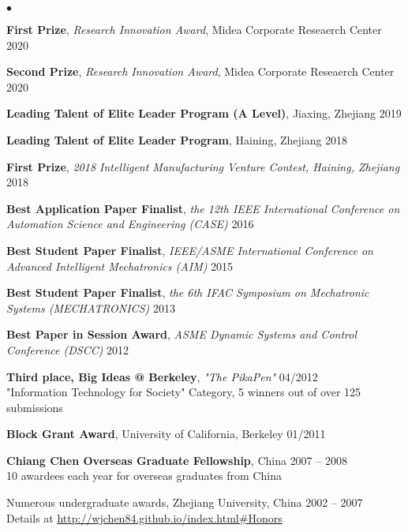 \documentclass[UTF8,fontset=none]{res}
\begin{document}
\begin{resume}
\begin{list}{$\bullet$}{\setlength\leftmargin{0in}\setlength\topsep{0in}}
\item \textbf{First Prize}, \emph{Research Innovation Award}, Midea Corporate Reseaerch Center \hfill{2020}
\item \textbf{Second Prize}, \emph{Research Innovation Award}, Midea Corporate Reseaerch Center \hfill{2020}
\item \textbf{Leading Talent of Elite Leader Program (A Level)}, Jiaxing, Zhejiang \hfill{2019}
\item \textbf{Leading Talent of Elite Leader Program}, Haining, Zhejiang \hfill{2018}
\item \textbf{First Prize}, \emph{2018 Intelligent Manufacturing Venture Contest, Haining, Zhejiang} \hfill{2018}
\item \textbf{Best Application Paper Finalist}, \emph{the 12th IEEE International Conference on Automation Science and Engineering (CASE)} \hfill{2016}
\item \textbf{Best Student Paper Finalist}, \emph{IEEE/ASME International Conference on Advanced Intelligent Mechatronics (AIM)} \hfill{2015}
\item \textbf{Best Student Paper Finalist}, \emph{the 6th IFAC Symposium on Mechatronic Systems (MECHATRONICS)} \hfill{2013}
\item \textbf{Best Paper in Session Award}, \emph{ASME Dynamic Systems and Control Conference (DSCC)} \hfill{2012}
\item \textbf{Third place, Big Ideas @ Berkeley}, \emph{"The PikaPen"} \hfill{04/2012} \\
"Information Technology for Society" Category, 5 winners out of over 125 submissions
\item \textbf{Block Grant Award}, University of California, Berkeley \hfill{01/2011}
\item \textbf{Chiang Chen Overseas Graduate Fellowship}, China \hfill{2007 -- 2008}\\
10 awardees each year for overseas graduates from China
\item Numerous undergraduate awards, Zhejiang University, China \hfill{2002 -- 2007}\\
Details at \url{http://wjchen84.github.io/index.html#Honors}

\end{list}
\end{resume}
\end{document}
